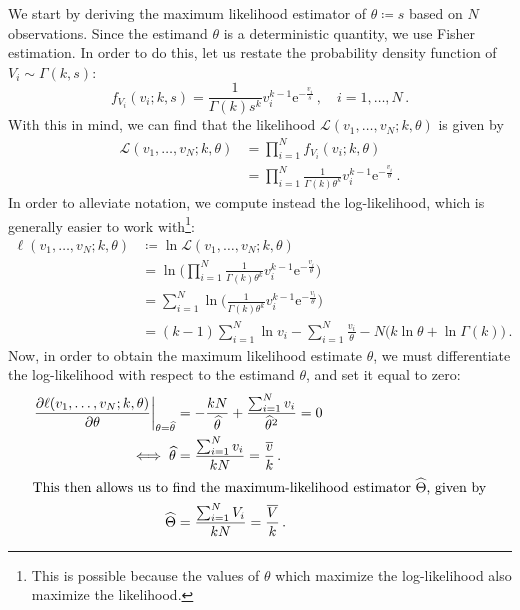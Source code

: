 \documentclass[final]{aomart}
\newtheorem[{}\it]{thm}{Theorem}[section]
\theoremstyle{definition}
\newtheorem*[{}\it]{notation}{Notation}
\numberwithin{equation}{section}
\newcommand{\wh}{\widehat}
\newcommand{\like}{\mathcal{L}} %
\newcommand{\e}{\mathrm{e}} %
\newcommand{\pdf}{f} %
\newcommand{\htheta}{\wh{\theta}} %
\newcommand{\hTheta}{\wh{\Theta}} %
\newcommand{\eval}[2][\right]{\relax
  \ifx#1\right\relax \left.\fi#2#1\rvert}
\begin{document}
We start by deriving the maximum likelihood estimator of \(\theta \coloneqq s\) based on \(N\) observations.
Since the estimand $\theta$ is a deterministic quantity, we use Fisher estimation. %
In order to do this, let us restate the probability density function of \(V_i \sim \Gamma(k, s)\):
\begin{equation}
\pdf_{V_i}(v_i; k, s) = \frac{1}{\Gamma(k) s^k} v_i^{k-1} \e^{-\frac{v_i}{s}}\,, \quad i = 1, \ldots, N\,.
\end{equation}
With this in mind, we can find that the likelihood \(\like(v_1, \ldots, v_N; k, \theta)\) is given by
\begin{align}
\like(v_1, \ldots, v_N; k, \theta) &= \prod_{i=1}^{N} \pdf_{V_i}(v_i; k,\theta)\\
&= \prod_{i=1}^{N} \frac{1}{\Gamma(k) \theta^k} v_i^{k-1} \e^{-\frac{v_i}{\theta}}\,.
\end{align}
In order to alleviate notation, we compute instead the log-likelihood, which is generally easier to work with\footnote{This is possible because the values of \(\theta\) which maximize the log-likelihood also maximize the likelihood.}:
\begin{align}
\ell(v_1, \ldots, v_N; k, \theta) &\coloneqq \ln \like(v_1, \ldots, v_N; k, \theta)\\
&= \ln\Bigg(\prod_{i=1}^{N} \frac{1}{\Gamma(k) \theta^k} v_i^{k-1} \e^{-\frac{v_i}{\theta}} \Bigg)\\
& = \sum_{i=1}^{N} \ln\Bigg(\frac{1}{\Gamma(k) \theta^k} v_i^{k-1} \e^{-\frac{v_i}{\theta}}\Bigg)\\
& = (k-1) \sum_{i=1}^{N}\ln v_i - \sum_{i=1}^{N} \frac{v_i}{\theta} - N \big(k \ln \theta + \ln \Gamma(k)\big)\,.\label{loglikelihood}
\end{align}
Now, in order to obtain the maximum likelihood estimate \(\htheta\), we must differentiate the log-likelihood with respect to the estimand \(\theta\), and set it equal to zero:
\begin{align}
\eval{\frac{\partial \ell(v_1, \ldots, v_N; k, \theta)}{\partial \theta}}_{\theta = \htheta} &= -\frac{kN}{\htheta} + \frac{\sum_{i=1}^{N} v_i}{\htheta^2} = 0\\
\iff \htheta &= \frac{\sum_{i=1}^{N} v_i}{kN} = \frac{\widebar{v}}{k}\,.\\
\intertext{This then allows us to find the maximum-likelihood estimator \(\hTheta\), given by}
\hTheta &= \frac{\sum_{i=1}^{N} V_i}{kN} = \frac{\widebar{V}}{k}\,.\label{eq:mlestimator}
\end{align}
\end{document}
